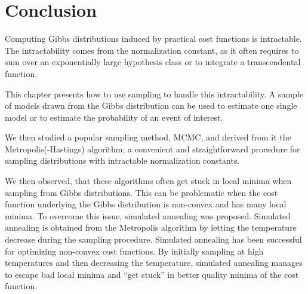\section{Conclusion}

Computing Gibbs distributions induced by practical cost functions is intractable. The intractability comes from the normalization constant, as it often requires to sum over an exponentially large hypothesis class or to integrate a transcendental function.

This chapter presents how to use sampling to handle this intractability. A sample of models drawn from the Gibbs distribution can be used to estimate one single model or to estimate the probability of an event of interest.

We then studied a popular sampling method, MCMC, and derived from it the Metropolis(-Hastings) algorithm, a convenient and straightforward procedure for sampling distributions with intractable normalization constants.

We then observed, that these algorithms often get stuck in local minima when sampling from Gibbs distributions. This can be problematic when the cost function underlying the Gibbs distribution is non-convex and has many local minima. To overcome this issue, simulated annealing was proposed. Simulated annealing is obtained from the Metropolis algorithm by letting the temperature decrease during the sampling procedure. Simulated annealing has been successful for optimizing non-convex cost functions. By initially sampling at high temperatures and then decreasing the temperature, simulated annealing manages to escape bad local minima and ``get stuck'' in better quality minima of the cost function.

